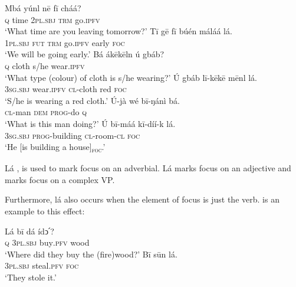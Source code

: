 \documentclass[output=paper,colorlinks,citecolor=brown]{langscibook}
\begin{document}
\ea%
    \label{ex:bisilki:26}
    \ea\label{ex:bisilki:26a}
        \ea\label{ex:bisilki:26ai}
        \gll    Mbá	yúnl	nē		fī	cháá?\\
                \textsc{q}	time	\textsc{2pl.sbj}	\textsc{trm}	go\textsc{.ipfv}\\
        \glt    ‘What time are you leaving tomorrow?’
        \ex\label{ex:bisilki:26aii}
        \gll    Tī		gē	fī	búén	máláá		lá.\\
                \textsc{1pl.sbj}	\textsc{fut}	\textsc{trm}	go\textsc{.ipfv}  early	\textsc{foc}\\
        \glt    ‘We will be going early.’
        \z
    \ex\label{ex:bisilki:26b}
        \ea\label{ex:bisilki:26bi}
        \gll    Bá	ákēkēln	ú	gbáb?\\
                \textsc{q}	cloth		s/he	wear\textsc{.ipfv}\\
        \glt    ‘What type (colour) of cloth is s/he wearing?’
        \ex\label{ex:bisilki:26bii}
        \gll    Ú	gbáb	lī-kēkē	mēnl		lá.\\
                \textsc{3sg.sbj}	wear\textsc{.ipfv}	\textsc{cl-}cloth	red	\textsc{foc}\\
        \glt    ‘S/he is wearing a red cloth.’
        \z
    \ex\label{ex:bisilki:26c}
        \ea\label{ex:bisilki:26ci}
        \gll    Ú-jà		wé	bī-ŋánì	bá.\\
                \textsc{cl-}man	\textsc{dem}	\textsc{prog-}do	\textsc{q}\\
        \glt    ‘What is this man doing?’
        \ex\label{ex:bisilki:26cii}
        \gll    Ú		bī-máá		kī-díí-k		lá.\\
                \textsc{3sg.sbj}	\textsc{prog-}building	\textsc{cl-}room\textsc{-cl}		\textsc{foc}\\
        \glt    ‘He [is building a house]\textsubscript{\textsc{foc}}.’
        \z
    
    \z
\z

Lá , is used to mark focus on an adverbial. Lá marks focus on an adjective and  marks focus on a complex VP.

Furthermore, lá also occurs when the element of focus is just the verb.  is an example to this effect:

\ea%
    \label{ex:bisilki:27}
    \ea\label{ex:bisilki:27a}
    \gll    Lá	bī		dá		ídↄ՛?\\
            \textsc{q}	\textsc{3pl.sbj}	buy\textsc{.pfv}	wood\\
    \glt    ‘Where did they buy the (fire)wood?’
    \ex\label{ex:bisilki:27b}
    \gll    Bī		sūn		lá.\\
            \textsc{3pl.sbj}	steal\textsc{.pfv}	\textsc{foc}\\
    \glt    ‘They stole it.’
    \z
\z
\end{document}
